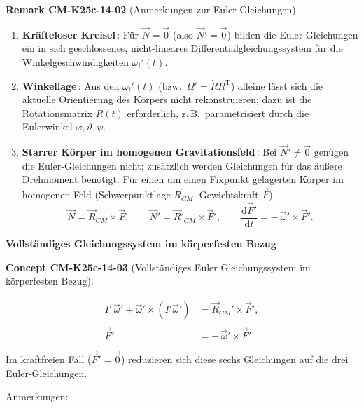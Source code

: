 \documentclass[10pt, letterpaper]{article}
\newcommand{\CustomHeading}[3]{%
  \par\medskip\noindent%
  \textbf{#1 #2} \textnormal{(#3)}.\enskip%
}
\newenvironment{REM}[2]{\begin{unitbox}\CustomHeading{Remark}{#1}{#2}}{\end{unitbox}}
\newenvironment{CONC}[2]{\begin{unitbox}\CustomHeading{Concept}{#1}{#2}}{\end{unitbox}}
\begin{document}
\begin{REM}{CM-K25c-14-02}{Anmerkungen zur Euler Gleichungen}
\begin{enumerate}
  \item \textbf{Kräfteloser Kreisel}\,: Für $\vec N = \vec 0$ (also $\vec N'=\vec 0$) bilden die Euler‐Gleichungen ein in sich geschlossenes, nicht-lineares Differentialgleichungssystem für die Winkelgeschwindigkeiten $\omega_i'(t)$.

  \item \textbf{Winkellage}\,: Aus den $\omega_i'(t)$ (bzw.\ $\Omega'=\dot R R^{\mathrm T}$) alleine lässt sich die aktuelle Orientierung des Körpers nicht rekonstruieren; dazu ist die Rotationsmatrix $R(t)$ erforderlich, z.\,B.\ parametrisiert durch die Eulerwinkel $\varphi,\vartheta,\psi$.

  \item \textbf{Starrer Körper im homogenen Gravitationsfeld}\,:  
        Bei $\vec N'\neq\vec 0$ genügen die Euler‐Gleichungen nicht; zusätzlich werden Gleichungen für das äußere Drehmoment benötigt.  
        Für einen um einen Fixpunkt gelagerten Körper im homogenen Feld (Schwerpunktlage $\vec R_{CM}$, Gewichtskraft $\vec F$)
        \[
          \vec N = \vec R_{CM}\times\vec F,
          \qquad
          \vec N' = \vec R'_{CM}\times\vec F',
          \qquad
          \frac{\mathrm d\vec F'}{\mathrm dt}
          = -\,\vec\omega'\times\vec F'.
        \]
\end{enumerate}
\end{REM}

\textbf{Vollständiges Gleichungssystem im körperfesten Bezug}

\begin{CONC}{CM-K25c-14-03}{Vollständiges Euler Gleichungssystem im körperfesten Bezug}
\[
\boxed{
\begin{aligned}
I'\,\dot{\vec\omega}' + \vec\omega' \times (I'\vec\omega') &= \vec R_{CM}' \times \vec F', \\[4pt]
\dot{\vec F}' &= -\,\vec\omega' \times \vec F'.
\end{aligned}}
\]

Im kraftfreien Fall ($\vec F'=\vec 0$) reduzieren sich diese sechs Gleichungen auf die drei Euler‐Gleichungen.
\end{CONC}






\noindent
Anmerkungen:
\end{document}
